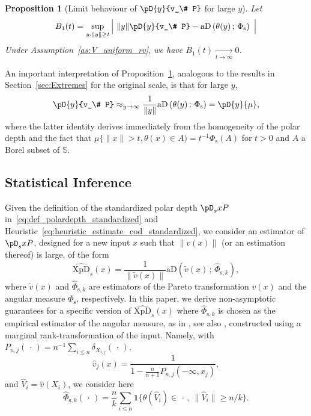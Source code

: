 \documentclass{article}
\numberwithin{equation}{section}
\newtheorem{proposition}{Proposition}[section]
\newcommand{\ind}{\mathbf{1}}
\newcommand{\un}{\ind}
\newcommand{\point}{\,\cdot\,}
\newcommand{\sphere}{\mathbb{S}}
\newcommand{\tto}{\xrightarrow[t\to\infty]{}}
\newcommand{\XpDsymbol}{\mathrm{XpD}}  %
\newcommand{\coD}[2]{\pD{#1}{#2}}
\newcommand{\coDs}[2]{\pD_s{#1}{#2}}
\newcommand{\hatcoDs}[1]{\widehat{\XpDsymbol}_s\left({#1}\right)}
\newcommand{\coDsinf}[1]{\pD_{s,\infty}({#1})}
\newcommand{\mus}{\mu}%
\newcommand{\aD}[2]{{\mathrm{aD}}\left({#1}\,;\,{#2}\right)}
\newcommand{\Phitrad}{\Phi_{\mathrm{s}}} %
\newcommand{\hatPhitrad}{\widehat{\Phi}_{\mathrm{s},k}} %
\begin{document}
\begin{proposition}[Limit behaviour of $\coD{y}{v_\# P} $ for large $y$]\label{prop:limit_coD_stand}
Let  
  $$
B_1(t) =  \sup_{ y: \|y \| \ge t}   \Big|~ \|y\| \coD{y}{v_\# P} - \aD{\theta(y)}{\Phitrad}~\Big| 
 $$
  Under %
  Assumption~\ref{as:V_uniform_rv}, we have $B_1(t) \tto 0$. 
\end{proposition}

An important interpretation of Proposition~\ref{prop:limit_coD_stand}, analogous to the results in Section~\ref{sec:Extremes} for the original scale, is that for large $y$,
\begin{equation}
\label{eq:heuristic_estimate_cod_standardized}
\coD{y}{v_\# P} \approx_{y\to\infty} \frac{1}{\|y\|}\aD{\theta(y)}{\Phitrad} = \pD{y}{\mus}, 
\end{equation}
where the latter identity derives immediately from the homogeneity of the polar depth and the fact that $\mus\{\|x\|>t, \theta(x)\in A) = t^{-1}\Phitrad(A)$ for $t>0$ and $A$ a Borel subset of $\sphere$. 

\subsection{Statistical Inference}

Given the
definition of the standardized polar depth $\coDs{x}{P}$ in~\eqref{eq:def_polardepth_standardized} and
Heuristic~\eqref{eq:heuristic_estimate_cod_standardized}, we consider 
an estimator of $\coDs{x}{P}$, designed for a new input $x$ such that $\|v(x)\|$ (or an estimation thereof) is large, of the form 
\begin{equation}\label{eq:def_estimator_standardizedDepth}
\hatcoDs{x} = \frac{1}{\| \tilde v (x)\|} \aD{\tilde v(x)}{\hatPhitrad}, 
\end{equation}
where $\tilde v(x)$ and $\hatPhitrad$ are estimators of the Pareto transformation $v(x)$ and the angular measure $\Phitrad$, respectively.
In this paper, we derive non-asymptotic guarantees for a specific version of $\hatcoDs{x}$ where $\hatPhitrad$ %
is chosen as the empirical estimator of the angular
measure, as in \cite{ClemenconJalalzaiSabourinSegers2023},  see
also \cite{einmahl2001nonparametric,einmahl2009maximum}, 
constructed using a marginal 
rank-transformation of the input. Namely, with $P_{n,j}(\point)= n^{-1}\sum_{i\le n}\delta_{X_{i,j}}(\point)$, 
$$\hat v_j(x) =  \frac{1}{1- \frac{n}{n+1}P_{n,j}(-\infty,x_j)},$$
and $\hat V_i = \hat v (X_i)$, we consider here 
$$
\hatPhitrad(\point) = \frac{n}{k}\sum_{i\le n} \un\{ \theta(\hat V_i)
\in \point, ~ \| \hat V_i\|\ge n/k \}.
$$
\end{document}

